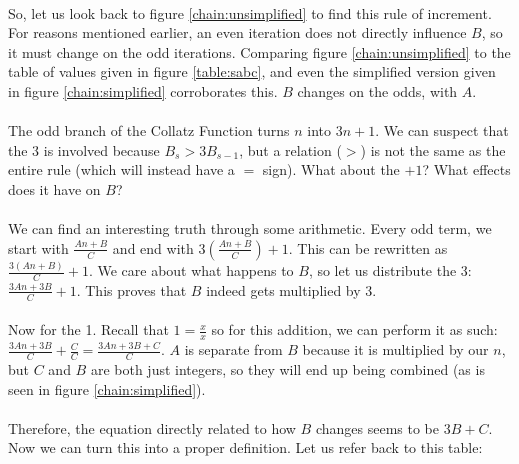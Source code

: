 \documentclass[12pt,letterpaper]{article}
\begin{document}
			\paragraph{} So, let us look back to figure \ref{chain:unsimplified} to find this rule of increment. For reasons mentioned earlier, an even iteration does not directly influence $B$, so it must change on the odd iterations. Comparing figure \ref{chain:unsimplified} to the table of values given in figure \ref{table:sabc}, and even the simplified version given in figure \ref{chain:simplified} corroborates this. $B$ changes on the odds, with $A$.
			
			\paragraph{} The odd branch of the Collatz Function turns $n$ into $3n+1$. We can suspect that the $3$ is involved because $B_s > 3B_{s-1}$, but a relation ($>$) is not the same as the entire rule (which will instead have a $=$ sign). What about the $+1$? What effects does it have on $B$?
			
			\paragraph{} We can find an interesting truth through some arithmetic. Every odd term, we start with $\frac{An + B}{C}$ and end with $3\left(\frac{An + B}{C}\right) + 1$. This can be rewritten as $\frac{3(An + B)}{C} + 1$. We care about what happens to $B$, so let us distribute the 3: $\frac{3An + 3B}{C} + 1$. This proves that $B$ indeed gets multiplied by 3. 
			
			\paragraph{} Now for the 1. Recall that $1 = \frac{x}{x}$ so for this addition, we can perform it as such: $\frac{3An + 3B}{C} + \frac{C}{C} = \frac{3An + 3B + C}{C}$. $A$ is separate from $B$ because it is multiplied by our $n$, but $C$ and $B$ are both just integers, so they will end up being combined (as is seen in figure \ref{chain:simplified}).
			
			\paragraph{} Therefore, the equation directly related to how $B$ changes seems to be $3B + C$. Now we can turn this into a proper definition. Let us refer back to this table:
			
\end{document}

